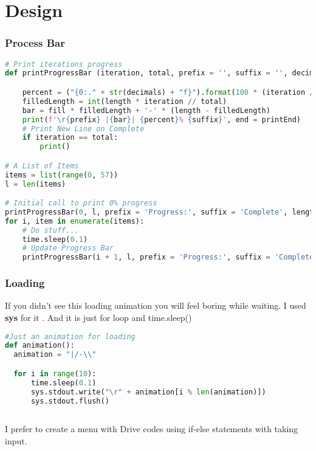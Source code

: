 \documentclass[onecolumn]{article}
\begin{document}
\section{Design}

\subsubsection{Process Bar}

\begin{lstlisting}[language=Python, caption=Loading Animation]
# Print iterations progress
def printProgressBar (iteration, total, prefix = '', suffix = '', decimals = 1, length = 100, fill = '█', printEnd = "\r"):

    percent = ("{0:." + str(decimals) + "f}").format(100 * (iteration / float(total)))
    filledLength = int(length * iteration // total)
    bar = fill * filledLength + '-' * (length - filledLength)
    print(f'\r{prefix} |{bar}| {percent}% {suffix}', end = printEnd)
    # Print New Line on Complete
    if iteration == total: 
        print()

# A List of Items
items = list(range(0, 57))
l = len(items)

# Initial call to print 0% progress
printProgressBar(0, l, prefix = 'Progress:', suffix = 'Complete', length = 50)
for i, item in enumerate(items):
    # Do stuff...
    time.sleep(0.1)
    # Update Progress Bar
    printProgressBar(i + 1, l, prefix = 'Progress:', suffix = 'Complete', length = 50)
    \end{lstlisting}
    
\subsubsection{Loading}
If you didn't see this loading animation you will feel boring while waiting. I used \textbf{sys} for it . And it is just for loop and time.sleep()

\begin{lstlisting}[language=Python, caption=Loading Animation]
#Just an animation for loading 
def animation():
  animation = "|/-\\" 

  for i in range(10):
      time.sleep(0.1)
      sys.stdout.write("\r" + animation[i % len(animation)])
      sys.stdout.flush()
  
\end{lstlisting}

I prefer to create a menu with Drive codes using if-else statements with taking input. \\\\\\
\end{document}
